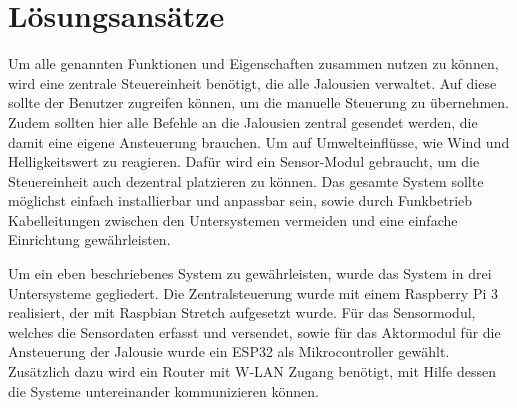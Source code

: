 \section{Lösungsansätze}
Um alle genannten Funktionen und Eigenschaften zusammen nutzen zu können, wird eine zentrale Steuereinheit benötigt, die alle Jalousien verwaltet. Auf diese sollte der Benutzer zugreifen können, um die manuelle Steuerung zu übernehmen. Zudem sollten hier alle Befehle an die Jalousien zentral gesendet werden, die damit eine eigene Ansteuerung brauchen. Um auf Umwelteinflüsse, wie Wind und Helligkeitswert zu reagieren. Dafür wird ein Sensor-Modul gebraucht, um die Steuereinheit auch dezentral platzieren zu können. Das gesamte System sollte möglichst einfach installierbar und anpassbar sein, sowie durch Funkbetrieb Kabelleitungen zwischen den Untersystemen vermeiden und eine einfache Einrichtung gewährleisten.

Um ein eben beschriebenes System zu gewährleisten, wurde das System in drei Untersysteme gegliedert. Die Zentralsteuerung wurde mit einem Raspberry Pi 3 realisiert, der mit Raspbian Stretch aufgesetzt wurde. Für das Sensormodul, welches die Sensordaten erfasst und versendet, sowie für das Aktormodul für die Ansteuerung der Jalousie wurde ein ESP32 als Mikrocontroller gewählt. Zusätzlich dazu wird ein Router mit W-LAN Zugang benötigt, mit Hilfe dessen die Systeme untereinander kommunizieren können.